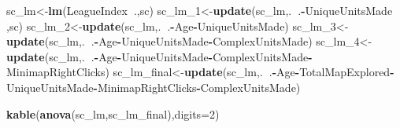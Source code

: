 \documentclass[]{article}
\newenvironment{Shaded}{\begin{snugshade}}{\end{snugshade}}
\newcommand{\DataTypeTok}[1]{\textcolor[rgb]{0.13,0.29,0.53}{#1}}
\newcommand{\DecValTok}[1]{\textcolor[rgb]{0.00,0.00,0.81}{#1}}
\newcommand{\KeywordTok}[1]{\textcolor[rgb]{0.13,0.29,0.53}{\textbf{#1}}}
\newcommand{\NormalTok}[1]{#1}
\newcommand{\OperatorTok}[1]{\textcolor[rgb]{0.81,0.36,0.00}{\textbf{#1}}}
\begin{document}
\begin{Shaded}
\begin{Highlighting}[]
{{{{{{{{{{{{{\NormalTok{sc_lm<-}\KeywordTok{lm}\NormalTok{(LeagueIndex}\OperatorTok{~}\NormalTok{.,sc)}
\NormalTok{sc_lm_}\DecValTok{1}\NormalTok{<-}\KeywordTok{update}\NormalTok{(sc_lm,.}\OperatorTok{~}\NormalTok{.}\OperatorTok{-}\NormalTok{UniqueUnitsMade ,sc)}
\NormalTok{sc_lm_}\DecValTok{2}\NormalTok{<-}\KeywordTok{update}\NormalTok{(sc_lm,.}\OperatorTok{~}\NormalTok{.}\OperatorTok{-}\NormalTok{Age}\OperatorTok{-}\NormalTok{UniqueUnitsMade)}
\NormalTok{sc_lm_}\DecValTok{3}\NormalTok{<-}\KeywordTok{update}\NormalTok{(sc_lm,.}\OperatorTok{~}\NormalTok{.}\OperatorTok{-}\NormalTok{Age}\OperatorTok{-}\NormalTok{UniqueUnitsMade}\OperatorTok{-}\NormalTok{ComplexUnitsMade)}
\NormalTok{sc_lm_}\DecValTok{4}\NormalTok{<-}\KeywordTok{update}\NormalTok{(sc_lm,.}\OperatorTok{~}\NormalTok{.}\OperatorTok{-}\NormalTok{Age}\OperatorTok{-}\NormalTok{UniqueUnitsMade}\OperatorTok{-}\NormalTok{ComplexUnitsMade}\OperatorTok{-}\NormalTok{MinimapRightClicks)}
\NormalTok{sc_lm_final<-}\KeywordTok{update}\NormalTok{(sc_lm,.}\OperatorTok{~}\NormalTok{.}\OperatorTok{-}\NormalTok{Age}\OperatorTok{-}\NormalTok{TotalMapExplored}\OperatorTok{-}\NormalTok{UniqueUnitsMade}\OperatorTok{-}\NormalTok{MinimapRightClicks}\OperatorTok{-}\NormalTok{ComplexUnitsMade)}

\KeywordTok{kable}\NormalTok{(}\KeywordTok{anova}\NormalTok{(sc_lm,sc_lm_final),}\DataTypeTok{digits=}\DecValTok{2}\NormalTok{)}

}}}}}}}}}}}}}
\end{Highlighting}
\end{Shaded}
\end{document}
